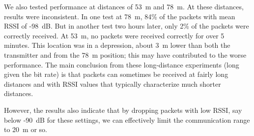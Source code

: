 We also tested performance at distances of 53~m and 78~m. At these distances, results were inconsistent. In one test
at 78~m, 84\% of the packets with mean RSSI of -98~dB. But in another test two hours later, only 2\% of the packets
were correctly received. At 53~m, no packets were received correctly for over 5 minutes. This location was in a depression,
about 3~m lower than both the transmitter and from the 78~m position; this may have contributed to the worse performance.
The main conclusion from these long-distance experiments (long given the bit rate) is that packets can sometimes be received
at fairly long distances and with RSSI values that typically characterize much shorter distances. 

However, the results also indicate that by dropping packets with low RSSI, say below -90~dB for these settings, we can
effectively limit the communication range to 20~m or so.